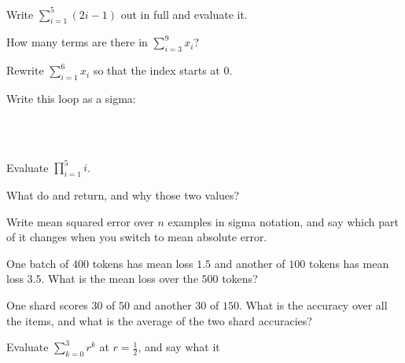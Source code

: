 \canyou

\begin{testexercises}
\item Write $\sum_{i=1}^{5} (2i - 1)$ out in full and evaluate it.
\item How many terms are there in $\sum_{i=3}^{9} x_i$?
\item Rewrite $\sum_{i=1}^{6} x_i$ so that the index starts at $0$.
\item Write this loop as a sigma:
  \begin{center}
  \\
  \\
  \end{center}
\item Evaluate $\prod_{i=1}^{5} i$.
\item What do  and  return, and why those two
  values?
\item Write mean squared error over $n$ examples in sigma notation, and say
  which part of it changes when you switch to mean absolute error.
\item One batch of $400$ tokens has mean loss $\num{1.5}$ and another of $100$
  tokens has mean loss $\num{3.5}$. What is the mean loss over the $500$
  tokens?
\item One shard scores $30$ of $50$ and another $30$ of $150$. What is the
  accuracy over all the items, and what is the average of the two shard
  accuracies?
\item Evaluate $\sum_{k=0}^{3} r^{k}$ at $r = \frac{1}{2}$, and say what it

\end{testexercises}
